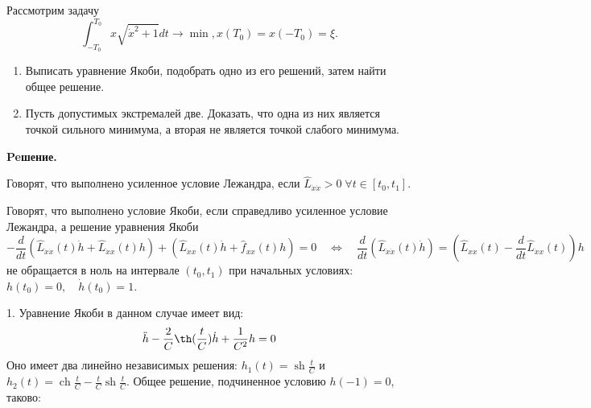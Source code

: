 \begin{task}
    Рассмотрим задачу
    \begin{equation*}
        \int_{-T_0}^{T_0} x \sqrt{\dot{x}^2+1} d t \rightarrow \min , 
        x\left(T_0\right) = x \left( -T_0 \right) = \xi.
    \end{equation*}
    \begin{enumerate}
        \item Выписать уравнение Якоби, подобрать одно из его решений, 
        затем найти общее решение. 
        \item Пусть допустимых экстремалей две. Доказать, что одна из них 
        является точкой сильного минимума, а вторая не является точкой слабого минимума.
    \end{enumerate}


    \textbf{Peшение.} 
    \begin{definition}
        Говорят, что выполнено усиленное условие Лежандра, 
        если $\widehat L_{\dot{x}\dot{x}} > 0 \; \forall t \in [t_0, t_1]$.
    \end{definition}

    \begin{definition} Говорят, что выполнено условие Якоби, 
        если справедливо усиленное условие Лежандра, а решение уравнения Якоби
        \begin{equation*}
            -\frac{d}{d t}\left(\widehat{L}_{\dot{x} \dot{x}}(t) \dot{h}
                +\widehat{L}_{\dot{x} x}(t) h\right)
                +\left(\widehat{L}_{\dot{x} x}(t) \dot{h}
                +\widehat{f}_{x x}(t) h\right)=0 \quad 
                \Leftrightarrow \quad \frac{d}{d t}\left(\widehat{L}_{\dot{x} \dot{x}}(t) \dot{h}\right)
                =\left(\widehat{L}_{x x}(t)-\frac{d}{d t} \widehat{L}_{\dot{x} x}(t)\right) h
        \end{equation*}
        не обращается в ноль на интервале $\left(t_0, t_1\right)$ при начальных условиях: 
        $h\left(t_0\right)=0, \quad \dot{h}\left(t_0\right)=1$.
\end{definition}

1. Уравнение Якоби в данном случае имеет вид:
\begin{equation*}
    \ddot{h}-\frac{2}{C} \th (\frac{t}{C}) \dot{h}+\frac{1}{C^2} h = 0    
\end{equation*}
Оно имеет два линейно независимых решения: 
$h_1(t)=\operatorname{sh} \frac{t}{C}$ и $h_2(t)=\operatorname{ch} \frac{t}{C}-\frac{t}{C} \operatorname{sh} \frac{t}{C}$. 
Общее решение, подчиненное условию $h(-1)=0$, таково:


\end{task}
